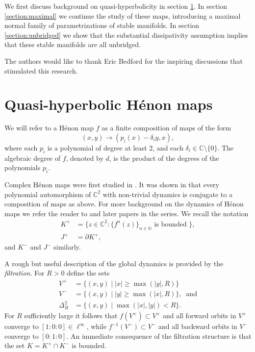 \documentclass[10pt,a4paper]{article}
\begin{document}
We first discuss background on quasi-hyperbolicity in section \ref{section:quasi}. In section \ref{section:maximal} we continue the study of these maps, introducing a maximal normal family of parametrizations of stable manifolds. In section \ref{section:unbridged} we show that the substantial dissipativity assumption implies that these stable manifolds are all unbridged.

\medskip

 The authors would like to thank Eric Bedford for the inspiring discussions that stimulated this research.

\section{Quasi-hyperbolic H\'enon maps}\label{section:quasi}

 We will refer to a H\'enon map $f$ as a finite composition of maps of the form
$$
(x,y) \rightarrow (p_i(x) - \delta_i y, x),
$$
where each $p_i$ is a polynomial of degree at least $2$, and each $\delta_i \in \mathbb C\setminus\{0\}$. The algebraic degree of $f$, denoted by $d$, is the product of the degrees of the polynomials $p_i$.

Complex H\'enon maps were first studied in \cite{Hu}. It was shown in \cite{FM} that every polynomial automorphism of $\mathbb C^2$ with non-trivial dynamics is conjugate to a composition of maps as above. For more background on the dynamics of H\'enon maps we refer the reader to \cite{BS1} and later papers in the series. We recall the notation
$$
\begin{aligned}
K^+ &= \{z \in \mathbb C^2 : \{f^n(z)\}_{n \in \mathbb N}  \text{ is bounded }\},\\
J^+ &= \partial K^+,
\end{aligned}
$$
and $K^-$ and $J^-$ similarly.

A rough but useful description of the global dynamics is provided by the \emph{filtration}. For $R>0$ define the sets
$$
\begin{aligned}
V^+ & = \{(x,y) \mid |x| \ge \max(|y|, R)\}\\
V^- & = \{(x,y) \mid |y| \ge \max(|x|, R)\}, \; \; \mathrm{and}\\
\Delta^2_R & = \{(x,y) \mid \max(|x|,|y|) < R\}.
\end{aligned}
$$
For $R$ sufficiently large it follows that $f(V^+) \subset V^+$ and all forward orbits in $V^+$ converge to $[1:0:0] \in \ell^\infty$, while $f^{-1}(V^-) \subset V^-$ and all backward orbits in $V^-$ converge to $[0:1:0]$. An immediate consequence of the filtration structure is that the set $K=K^+\cap K^-$ is bounded.
\end{document}
